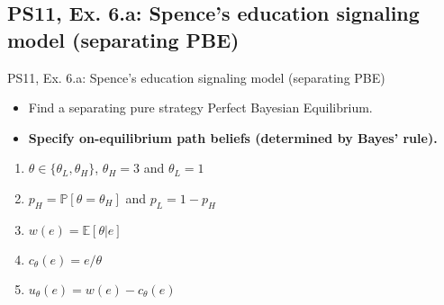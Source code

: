\subsection{PS11, Ex. 6.a: Spence’s education signaling model (separating PBE)}
\begin{frame}{PS11, Ex. 6.a: Spence’s education signaling model (separating PBE)}
    \begin{itemize}
      \item[(a)] Find a separating pure strategy Perfect Bayesian Equilibrium.
    \end{itemize}\vspace{-8pt}
    \begin{multicols}{2}
      \begin{itemize}
        \item[Step 1:] \textbf{Specify on-equilibrium path beliefs (determined by Bayes' rule).}
      \end{itemize}
      \vfill\null\columnbreak
      \begin{enumerate}
        \item[Types:] $\theta\in\{\theta_L,\theta_H\}$, $\theta_H=3$ and $\theta_L=1$
        \item[Prob.:] $p_H=\mathbb{P}[\theta=\theta_H]$ and $p_L=1-p_H$
        \item[Wage:] $w(e)=\mathbb{E}[\theta|e]$
        \item[Cost:] $c_\theta(e)=e/\theta$
        \item[Utility:] $u_\theta(e)=w(e)-c_\theta(e)$
      \end{enumerate}
      \vfill\null
    \end{multicols}
\end{frame}
